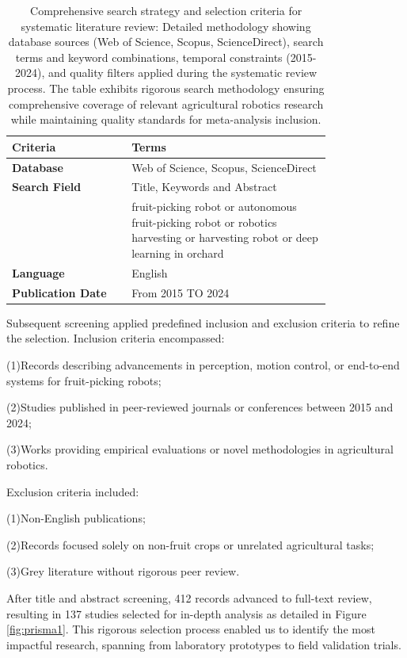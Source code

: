 \documentclass{ieeeaccess}
\begin{document}
\begin{table}[ht]
\small
\caption{Comprehensive search strategy and selection criteria for systematic literature review: Detailed methodology showing database sources (Web of Science, Scopus, ScienceDirect), search terms and keyword combinations, temporal constraints (2015-2024), and quality filters applied during the systematic review process. The table exhibits rigorous search methodology ensuring comprehensive coverage of relevant agricultural robotics research while maintaining quality standards for meta-analysis inclusion.} 
\label{tab:keywords} 
\begin{tabular}{p{0.3\linewidth} p{0.5\linewidth}}
\hline
\textbf{Criteria} & \textbf{Terms} \\ \hline
\textbf{Database}  &  Web of Science, Scopus, ScienceDirect \\
\textbf{Search Field} & Title, Keywords and Abstract\\
 & fruit-picking robot or autonomous fruit-picking robot  or robotics harvesting or harvesting robot or deep learning in orchard\\
\textbf{Language} & English \\
\textbf{Publication Date} & From 2015 TO 2024 \\ \hline 
\end{tabular}
\end{table}

Subsequent screening applied predefined inclusion and exclusion criteria to refine the selection. Inclusion criteria encompassed:

(1)Records describing advancements in perception, motion control, or end-to-end systems for fruit-picking robots;

(2)Studies published in peer-reviewed journals or conferences between 2015 and 2024;

(3)Works providing empirical evaluations or novel methodologies in agricultural robotics.

Exclusion criteria included:

(1)Non-English publications;

(2)Records focused solely on non-fruit crops or unrelated agricultural tasks;

(3)Grey literature without rigorous peer review.

After title and abstract screening, 412 records advanced to full-text review, resulting in 137 studies selected for in-depth analysis as detailed in Figure \ref{fig:prisma1}. This rigorous selection process enabled us to identify the most impactful research, spanning from laboratory prototypes to field validation trials. 
\end{document}

